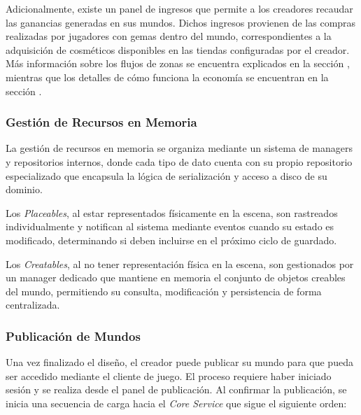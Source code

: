 Adicionalmente, existe un panel de ingresos que permite a los creadores recaudar las
ganancias generadas en sus mundos. Dichos ingresos provienen de las compras realizadas por jugadores
con gemas dentro del mundo, correspondientes a la adquisición de cosméticos disponibles en las tiendas
configuradas por el creador. Más información sobre los flujos de zonas se encuentra explicados en la sección 
, mientras que los detalles de cómo funciona la economía se encuentran en la sección 
.


\subsubsection{Gestión de Recursos en Memoria}

La gestión de recursos en memoria se organiza mediante un sistema de managers y repositorios internos, 
donde cada tipo de dato cuenta con su propio repositorio especializado que encapsula la lógica de 
serialización y acceso a disco de su dominio.

Los \textit{Placeables}, al estar representados físicamente en la escena, son rastreados individualmente y 
notifican al sistema mediante eventos cuando su estado es modificado, determinando si deben incluirse 
en el próximo ciclo de guardado.

Los \textit{Creatables}, al no tener representación física en la escena, son gestionados por un manager dedicado 
que mantiene en memoria el conjunto de objetos creables del mundo, permitiendo su consulta, modificación 
y persistencia de forma centralizada.

\subsubsection{Publicación de Mundos}

Una vez finalizado el diseño, el creador puede publicar su mundo para que pueda ser accedido mediante el cliente de juego.
El proceso requiere haber iniciado sesión y se realiza desde el panel de publicación. Al confirmar la publicación,
se inicia una secuencia de carga hacia el \textit{Core Service} que sigue el siguiente orden:


